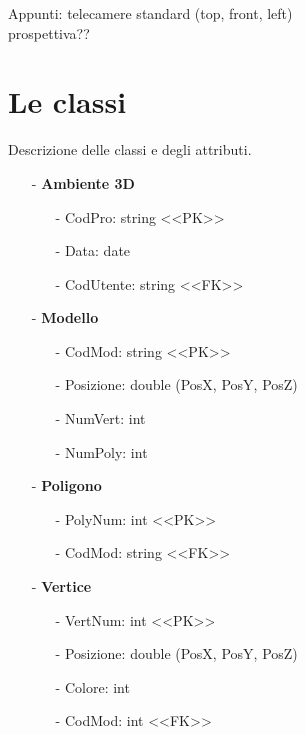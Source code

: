 \documentclass[a4paper,12pt]{report}
\begin{document}
Appunti: 
telecamere standard (top, front, left)\\
prospettiva??\\
\section{Le classi}
Descrizione delle classi e degli attributi.
\begin{itemize}
	\item[-] {\bf Ambiente 3D}
		\begin{small}\begin{itemize}
			\item[-] CodPro: string  <\-<PK>\->
			\item[-] Data: date
			\item[-] CodUtente: string <\-<FK>\->
		\end{itemize}\end{small}
\end{itemize}
\begin{itemize}
	\item[-] {\bf Modello}
		\begin{small}\begin{itemize}
			\item[-] CodMod: string <\-<PK>\->
			\item[-] Posizione: double (PosX, PosY, PosZ)
			\item[-] NumVert: int
			\item[-] NumPoly: int
		\end{itemize}\end{small}
	\item[-] {\bf Poligono}
		\begin{small}\begin{itemize}
			\item[-] PolyNum: int <\-<PK>\->
			\item[-] CodMod: string <\-<FK>\->
		\end{itemize}\end{small}
	\item[-] {\bf Vertice}
		\begin{small}\begin{itemize}
			\item[-] VertNum: int <\-<PK>\->
			\item[-] Posizione: double (PosX, PosY, PosZ)
			\item[-] Colore: int
			\item[-] CodMod: int <\-<FK>\->
		\end{itemize}\end{small}
\end{itemize}
\end{document}
